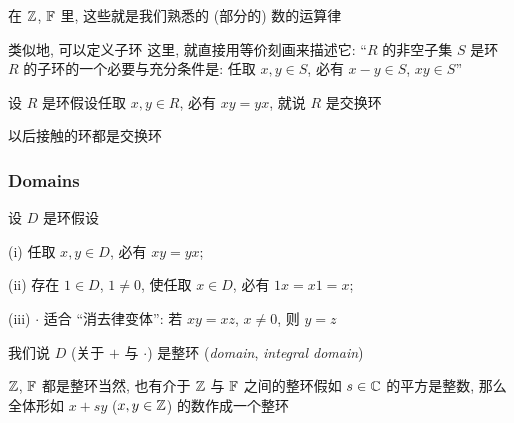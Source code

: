 \begin{example}
    在 $\mathbb{Z}$, $\mathbb{F}$ 里, 这些就是我们熟悉的 (部分的) 数的运算律\period
\end{example}

\begin{remark}
    类似地, 可以定义子环 \period 这里, 就直接用等价刻画来描述它: ``$R$ 的非空子集 $S$ 是环 $R$ 的子环的一个必要与充分条件是: 任取 $x,y \in S$, 必有 $x-y \in S$, $xy \in S$\period ''
\end{remark}

\begin{definition}
    设 $R$ 是环\period 假设任取 $x,y \in R$, 必有 $xy = yx$, 就说 $R$ 是交换环 \period
\end{definition}

\begin{remark}
    以后接触的环都是交换环\period
\end{remark}

\subsubsection*{Domains}

\begin{definition}
    设 $D$ 是环\period 假设

    (i) 任取 $x,y \in D$, 必有 $xy = yx$;

    (ii) 存在 $1 \in D$, $1 \neq 0$, 使任取 $x \in D$, 必有 $1x = x1 = x$;

    (iii) $\cdot$ 适合 ``消去律变体'': 若 $xy = xz$, $x \neq 0$, 则 $y = z$\period

    我们说 $D$ (关于 $+$ 与 $\cdot$) 是整环 (\textit{domain}, \textit{integral domain})\period
\end{definition}

\begin{example}
    $\mathbb{Z}$, $\mathbb{F}$ 都是整环\period 当然, 也有介于 $\mathbb{Z}$ 与 $\mathbb{F}$ 之间的整环\period 假如 $s \in \mathbb{C}$ 的平方是整数, 那么全体形如 $x + sy$ ($x,y \in \mathbb{Z}$) 的数作成一个整环\period
\end{example}

